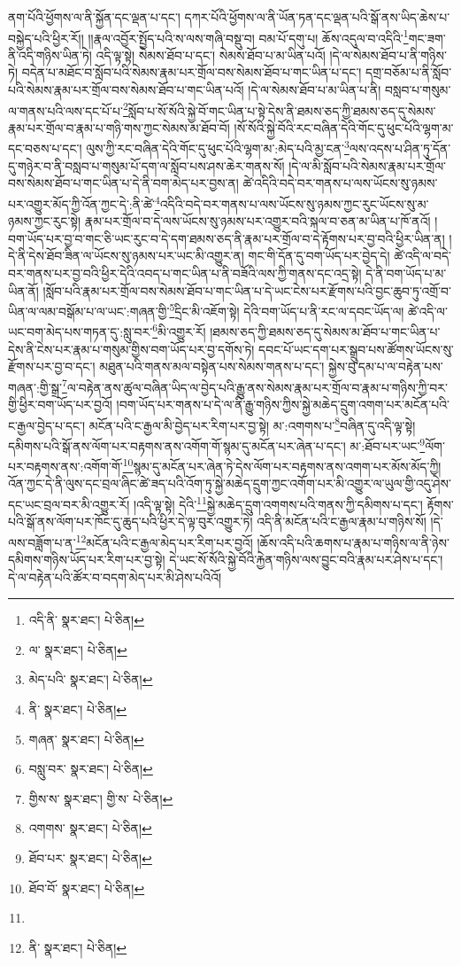 ནག་པོའི་ཕྱོགས་ལ་ནི་སྐྱོན་དང་ལྡན་པ་དང་། དཀར་པོའི་ཕྱོགས་ལ་ནི་ཡོན་ཏན་དང་ལྡན་པའི་སྒོ་ནས་ཡིད་ཆེས་པ་བསྐྱེད་པའི་ཕྱིར་རོ།། །།རྣལ་འབྱོར་སྤྱོད་པའི་ས་ལས་གཞི་བསྡུ་བ། བམ་པོ་དགུ་པ། ཆོས་འདུལ་བ་འདིའི་\footnote{འདི་ནི་  སྣར་ཐང་།  པེ་ཅིན། }གང་ཟག་ནི་འདི་གཉིས་ཡིན་ཏེ། འདི་ལྟ་སྟེ། སེམས་ཐོབ་པ་དང་། སེམས་ཐོབ་པ་མ་ཡིན་པའོ། །དེ་ལ་སེམས་ཐོབ་པ་ནི་གཉིས་ཏེ། བདེན་པ་མཐོང་བ་སློབ་པའི་སེམས་རྣམ་པར་གྲོལ་བས་སེམས་ཐོབ་པ་གང་ཡིན་པ་དང་། དགྲ་བཅོམ་པ་ནི་སློབ་པའི་སེམས་རྣམ་པར་གྲོལ་བས་སེམས་ཐོབ་པ་གང་ཡིན་པའོ། །དེ་ལ་སེམས་ཐོབ་པ་མ་ཡིན་པ་ནི། བསླབ་པ་གསུམ་ལ་གནས་པའི་ལས་དང་པོ་པ་\footnote{ལ་  སྣར་ཐང་།  པེ་ཅིན། }སློབ་པ་སོ་སོའི་སྐྱེ་བོ་གང་ཡིན་པ་སྟེ་དེས་ནི་ཐམས་ཅད་ཀྱི་ཐམས་ཅད་དུ་སེམས་རྣམ་པར་གྲོལ་བ་རྣམ་པ་གཉི་གས་ཀྱང་སེམས་མ་ཐོབ་བོ། །སོ་སོའི་སྐྱེ་བོའི་རང་བཞིན་དེའི་གོང་དུ་ཕུང་པོའི་ལྷག་མ་དང་བཅས་པ་དང་། ལུས་ཀྱི་རང་བཞིན་དེའི་གོང་དུ་ཕུང་པོའི་ལྷག་མ་:མེད་པའི་མྱ་ངན་\footnote{མེད་པའི་  སྣར་ཐང་།  པེ་ཅིན། }ལས་འདས་པ་ཤིན་ཏུ་དོན་དུ་གཉེར་བ་ནི་བསླབ་པ་གསུམ་པོ་དག་ལ་སློབ་པས་ཤས་ཆེར་གནས་སོ། །དེ་ལ་མི་སློབ་པའི་སེམས་རྣམ་པར་གྲོལ་བས་སེམས་ཐོབ་པ་གང་ཡིན་པ་དེ་ནི་བག་མེད་པར་བྱས་ན། ཚེ་འདིའི་བདེ་བར་གནས་པ་ལས་ཡོངས་སུ་ཉམས་པར་འགྱུར་མོད་ཀྱི་འོན་ཀྱང་དེ་:ནི་ཚེ་\footnote{ནི་  སྣར་ཐང་།  པེ་ཅིན། }འདིའི་བདེ་བར་གནས་པ་ལས་ཡོངས་སུ་ཉམས་ཀྱང་རུང་ཡོངས་སུ་མ་ཉམས་ཀྱང་རུང་སྟེ། རྣམ་པར་གྲོལ་བ་དེ་ལས་ཡོངས་སུ་ཉམས་པར་འགྱུར་བའི་སྐལ་བ་ཅན་མ་ཡིན་པ་ཁོ་ནའོ། །བག་ཡོད་པར་བྱ་བ་གང་ཅི་ཡང་རུང་བ་དེ་དག་ཐམས་ཅད་ནི་རྣམ་པར་གྲོལ་བ་དེ་རྟོགས་པར་བྱ་བའི་ཕྱིར་ཡིན་ན། །དེ་ནི་དེས་ཐོབ་ཟིན་ལ་ཡོངས་སུ་ཉམས་པར་ཡང་མི་འགྱུར་ན། གང་གི་དོན་དུ་བག་ཡོད་པར་བྱེད་དེ། ཚེ་འདི་ལ་བདེ་བར་གནས་པར་བྱ་བའི་ཕྱིར་དེའི་འབད་པ་གང་ཡིན་པ་ནི་བཟོའི་ལས་ཀྱི་གནས་དང་འདྲ་སྟེ། དེ་ནི་བག་ཡོད་པ་མ་ཡིན་ནོ། །སློབ་པའི་རྣམ་པར་གྲོལ་བས་སེམས་ཐོབ་པ་གང་ཡིན་པ་དེ་ཡང་ངེས་པར་རྫོགས་པའི་བྱང་ཆུབ་ཏུ་འགྲོ་བ་ཡིན་ལ་ལམ་བསྒོམ་པ་ལ་ཡང་:གཞན་གྱི་\footnote{གཞན་  སྣར་ཐང་།  པེ་ཅིན། }དྲིང་མི་འཇོག་སྟེ། དེའི་བག་ཡོད་པ་ནི་རང་ལ་དབང་ཡོད་ལ། ཚེ་འདི་ལ་ཡང་བག་མེད་པས་གཏན་དུ་:སླུ་བར་\footnote{བསླུ་བར་  སྣར་ཐང་།  པེ་ཅིན། }མི་འགྱུར་རོ། །ཐམས་ཅད་ཀྱི་ཐམས་ཅད་དུ་སེམས་མ་ཐོབ་པ་གང་ཡིན་པ་དེས་ནི་ངེས་པར་རྣམ་པ་གསུམ་གྱིས་བག་ཡོད་པར་བྱ་དགོས་ཏེ། དབང་པོ་ཡང་དག་པར་སྒྲུབ་པས་ཚོགས་ཡོངས་སུ་རྫོགས་པར་བྱ་བ་དང་། མཐུན་པའི་གནས་མལ་བསྟེན་པས་སེམས་གནས་པ་དང་། སྐྱེས་བུ་དམ་པ་ལ་བརྟེན་པས་གཞན་:གྱི་སྒྲ་\footnote{གྱིས་ས་  སྣར་ཐང་། གྱི་ས་  པེ་ཅིན། }ལ་བརྟེན་ནས་ཚུལ་བཞིན་ཡིད་ལ་བྱེད་པའི་རྒྱུ་ནས་སེམས་རྣམ་པར་གྲོལ་བ་རྣམ་པ་གཉིས་ཀྱི་བར་གྱི་ཕྱིར་བག་ཡོད་པར་བྱའོ། །བག་ཡོད་པར་གནས་པ་དེ་ལ་ནི་རྒྱུ་གཉིས་ཀྱིས་སྐྱེ་མཆེད་དྲུག་འགག་པར་མངོན་པའི་ང་རྒྱལ་བྱེད་པ་དང་། མངོན་པའི་ང་རྒྱལ་མི་བྱེད་པར་རིག་པར་བྱ་སྟེ། མ་:འགགས་པ་\footnote{འགགས་  སྣར་ཐང་།  པེ་ཅིན། }བཞིན་དུ་འདི་ལྟ་སྟེ། དམིགས་པའི་སྒོ་ནས་ལོག་པར་བརྟགས་ནས་འགོག་གོ་སྙམ་དུ་མངོན་པར་ཞེན་པ་དང་། མ་:ཐོབ་པར་ཡང་\footnote{ཐོབ་པར་  སྣར་ཐང་།  པེ་ཅིན། }ལོག་པར་བརྟགས་ནས་:འགོག་གོ་\footnote{ཐོབ་བོ་  སྣར་ཐང་།  པེ་ཅིན། }སྙམ་དུ་མངོན་པར་ཞེན་ཏེ་དེས་ལོག་པར་བརྟགས་ནས་འགག་པར་མོས་མོད་ཀྱི། འོན་ཀྱང་དེ་ནི་ལུས་དང་བྲལ་ཞིང་ཚེ་ཟད་པའི་འོག་ཏུ་སྐྱེ་མཆེད་དྲུག་ཀྱང་འགོག་པར་མི་འགྱུར་ལ་ཡུལ་གྱི་འདུ་ཤེས་དང་ཡང་བྲལ་བར་མི་འགྱུར་རོ། །འདི་ལྟ་སྟེ། དེའི་\footnote{}སྐྱེ་མཆེད་དྲུག་འགགས་པའི་གནས་ཀྱི་དམིགས་པ་དང་། རྟོགས་པའི་སྒོ་ནས་ལོག་པར་ཁོང་དུ་ཆུད་པའི་ཕྱིར་དེ་ལྟ་བུར་འགྱུར་ཏེ། འདི་ནི་མངོན་པའི་ང་རྒྱལ་རྣམ་པ་གཉིས་སོ། །དེ་ལས་བཟློག་པ་ན་\footnote{ནི་  སྣར་ཐང་།  པེ་ཅིན། }མངོན་པའི་ང་རྒྱལ་མེད་པར་རིག་པར་བྱའོ། །ཆོས་འདི་པའི་ཆགས་པ་རྣམ་པ་གཉིས་ལ་ནི་ཉེས་དམིགས་གཉིས་ཡོད་པར་རིག་པར་བྱ་སྟེ། དེ་ཡང་སོ་སོའི་སྐྱེ་བོའི་རྐྱེན་གཉིས་ལས་བྱུང་བའི་རྣམ་པར་ཤེས་པ་དང་། དེ་ལ་བརྟེན་པའི་ཚོར་བ་བདག་མེད་པར་མི་ཤེས་པའིའོ། 